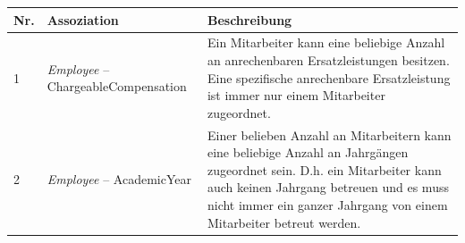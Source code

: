 \documentclass[fontsize=12pt,paper=a4,twoside]{scrartcl}
\begin{document}
\begin{tabularx}{\textwidth}{|p{0.6cm}|p{5cm}|X|}
\hline
\textbf{Nr.} & \textbf{Assoziation} & \textbf{Beschreibung} \\\hline
1 	& \textit{Employee} -- ChargeableCompensation	& Ein Mitarbeiter kann eine beliebige Anzahl
	an anrechenbaren Ersatzleistungen besitzen. Eine spezifische anrechenbare Ersatzleistung ist immer nur einem Mitarbeiter zugeordnet. \\\hline
2	& \textit{Employee} -- AcademicYear 	& Einer belieben Anzahl an Mitarbeitern kann eine 
	beliebige Anzahl an Jahrgängen zugeordnet sein. D.h. ein Mitarbeiter kann auch keinen Jahrgang betreuen und es muss nicht immer ein ganzer Jahrgang von einem Mitarbeiter betreut werden. \\\hline
\end{tabularx}\\
\end{document}
